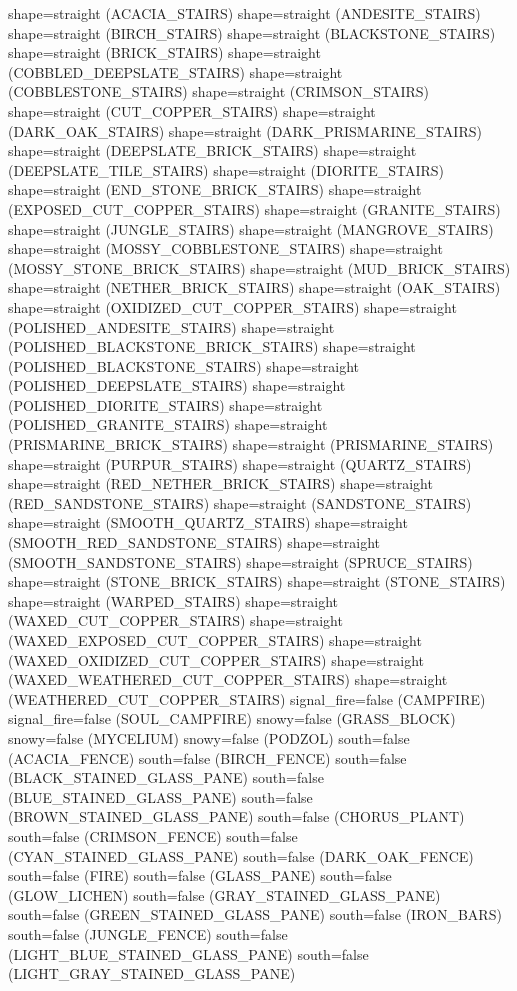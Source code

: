 \documentclass[11pt]{article}
\begin{document}
shape=straight (ACACIA_STAIRS)
shape=straight (ANDESITE_STAIRS)
shape=straight (BIRCH_STAIRS)
shape=straight (BLACKSTONE_STAIRS)
shape=straight (BRICK_STAIRS)
shape=straight (COBBLED_DEEPSLATE_STAIRS)
shape=straight (COBBLESTONE_STAIRS)
shape=straight (CRIMSON_STAIRS)
shape=straight (CUT_COPPER_STAIRS)
shape=straight (DARK_OAK_STAIRS)
shape=straight (DARK_PRISMARINE_STAIRS)
shape=straight (DEEPSLATE_BRICK_STAIRS)
shape=straight (DEEPSLATE_TILE_STAIRS)
shape=straight (DIORITE_STAIRS)
shape=straight (END_STONE_BRICK_STAIRS)
shape=straight (EXPOSED_CUT_COPPER_STAIRS)
shape=straight (GRANITE_STAIRS)
shape=straight (JUNGLE_STAIRS)
shape=straight (MANGROVE_STAIRS)
shape=straight (MOSSY_COBBLESTONE_STAIRS)
shape=straight (MOSSY_STONE_BRICK_STAIRS)
shape=straight (MUD_BRICK_STAIRS)
shape=straight (NETHER_BRICK_STAIRS)
shape=straight (OAK_STAIRS)
shape=straight (OXIDIZED_CUT_COPPER_STAIRS)
shape=straight (POLISHED_ANDESITE_STAIRS)
shape=straight (POLISHED_BLACKSTONE_BRICK_STAIRS)
shape=straight (POLISHED_BLACKSTONE_STAIRS)
shape=straight (POLISHED_DEEPSLATE_STAIRS)
shape=straight (POLISHED_DIORITE_STAIRS)
shape=straight (POLISHED_GRANITE_STAIRS)
shape=straight (PRISMARINE_BRICK_STAIRS)
shape=straight (PRISMARINE_STAIRS)
shape=straight (PURPUR_STAIRS)
shape=straight (QUARTZ_STAIRS)
shape=straight (RED_NETHER_BRICK_STAIRS)
shape=straight (RED_SANDSTONE_STAIRS)
shape=straight (SANDSTONE_STAIRS)
shape=straight (SMOOTH_QUARTZ_STAIRS)
shape=straight (SMOOTH_RED_SANDSTONE_STAIRS)
shape=straight (SMOOTH_SANDSTONE_STAIRS)
shape=straight (SPRUCE_STAIRS)
shape=straight (STONE_BRICK_STAIRS)
shape=straight (STONE_STAIRS)
shape=straight (WARPED_STAIRS)
shape=straight (WAXED_CUT_COPPER_STAIRS)
shape=straight (WAXED_EXPOSED_CUT_COPPER_STAIRS)
shape=straight (WAXED_OXIDIZED_CUT_COPPER_STAIRS)
shape=straight (WAXED_WEATHERED_CUT_COPPER_STAIRS)
shape=straight (WEATHERED_CUT_COPPER_STAIRS)
signal_fire=false (CAMPFIRE)
signal_fire=false (SOUL_CAMPFIRE)
snowy=false (GRASS_BLOCK)
snowy=false (MYCELIUM)
snowy=false (PODZOL)
south=false (ACACIA_FENCE)
south=false (BIRCH_FENCE)
south=false (BLACK_STAINED_GLASS_PANE)
south=false (BLUE_STAINED_GLASS_PANE)
south=false (BROWN_STAINED_GLASS_PANE)
south=false (CHORUS_PLANT)
south=false (CRIMSON_FENCE)
south=false (CYAN_STAINED_GLASS_PANE)
south=false (DARK_OAK_FENCE)
south=false (FIRE)
south=false (GLASS_PANE)
south=false (GLOW_LICHEN)
south=false (GRAY_STAINED_GLASS_PANE)
south=false (GREEN_STAINED_GLASS_PANE)
south=false (IRON_BARS)
south=false (JUNGLE_FENCE)
south=false (LIGHT_BLUE_STAINED_GLASS_PANE)
south=false (LIGHT_GRAY_STAINED_GLASS_PANE)
\end{document}
